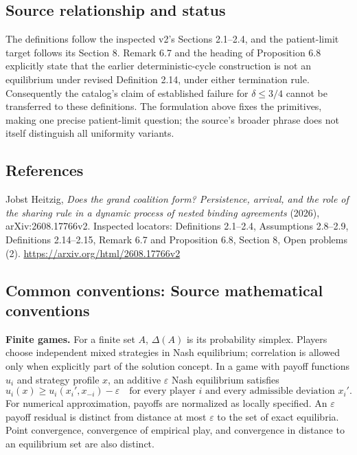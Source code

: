 \documentclass[11pt,a4paper]{article}
\begin{document}
\subsection*{Source relationship and status}
The definitions follow the inspected v2's Sections 2.1--2.4, and the patient-limit target follows its Section 8. Remark 6.7 and the heading of Proposition 6.8 explicitly state that the earlier deterministic-cycle construction is not an equilibrium under revised Definition 2.14, under either termination rule. Consequently the catalog's claim of established failure for $\delta\leq3/4$ cannot be transferred to these definitions. The formulation above fixes the primitives, making one precise patient-limit question; the source's broader phrase does not itself distinguish all uniformity variants.

\subsection*{References}
\begingroup\footnotesize\raggedright
\noindent [S1] Jobst Heitzig, \emph{Does the grand coalition form? Persistence, arrival, and the role of the sharing rule in a dynamic process of nested binding agreements} (2026), arXiv:2608.17766v2. Inspected locators: Definitions 2.1--2.4, Assumptions 2.8--2.9, Definitions 2.14--2.15, Remark 6.7 and Proposition 6.8, Section 8, Open problems (2).
\url{https://arxiv.org/html/2608.17766v2}
\par\endgroup

\subsection*{Common conventions: Source mathematical conventions}

\textbf{Finite games.} For a finite set $A$, $\Delta(A)$ is its probability
simplex. Players choose independent mixed strategies in Nash equilibrium;
correlation is allowed only when explicitly part of the solution concept.
In a game with payoff functions $u_i$ and strategy profile $x$, an additive
$\varepsilon$ Nash equilibrium satisfies
\[
 u_i(x)\geq u_i(x_i',x_{-i})-\varepsilon
 \quad\text{for every player $i$ and every admissible deviation $x_i'$}.
\]
For numerical approximation, payoffs are normalized as locally specified.
An $\varepsilon$ payoff residual is distinct from distance at most
$\varepsilon$ to the set of exact equilibria. Point convergence, convergence
of empirical play, and convergence in distance to an equilibrium set are
also distinct.
\end{document}
